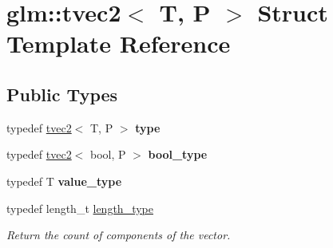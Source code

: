 \hypertarget{structglm_1_1tvec2}{\section{glm\-:\-:tvec2$<$ T, P $>$ Struct Template Reference}
\label{structglm_1_1tvec2}
}
\subsection*{Public Types}
\begin{DoxyCompactItemize}
\item 
\hypertarget{structglm_1_1tvec2_a387f2c68c61e26e75bbe3d67ee878f41}{typedef \hyperlink{structglm_1_1tvec2}{tvec2}$<$ T, P $>$ {\bfseries type}}\label{structglm_1_1tvec2_a387f2c68c61e26e75bbe3d67ee878f41}

\item 
\hypertarget{structglm_1_1tvec2_add34b9138a842221f63186e25378d92e}{typedef \hyperlink{structglm_1_1tvec2}{tvec2}$<$ bool, P $>$ {\bfseries bool\-\_\-type}}\label{structglm_1_1tvec2_add34b9138a842221f63186e25378d92e}

\item 
\hypertarget{structglm_1_1tvec2_a45de6851b3de40183d7e35deb7cb27ab}{typedef T {\bfseries value\-\_\-type}}\label{structglm_1_1tvec2_a45de6851b3de40183d7e35deb7cb27ab}

\item 
\hypertarget{structglm_1_1tvec2_a5a5ddebab821a3cf9185772386afbe8d}{typedef length\-\_\-t \hyperlink{structglm_1_1tvec2_a5a5ddebab821a3cf9185772386afbe8d}{length\-\_\-type}}\label{structglm_1_1tvec2_a5a5ddebab821a3cf9185772386afbe8d}

\begin{DoxyCompactList}\small\item\em Return the count of components of the vector. \end{DoxyCompactList}\end{DoxyCompactItemize}

